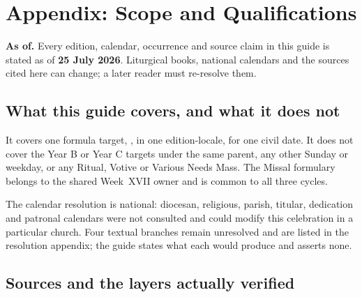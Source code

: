 \section*{Appendix: Scope and Qualifications}

\textbf{As of.} Every edition, calendar, occurrence and source claim in this guide is stated as of \textbf{25 July 2026}. Liturgical books, national calendars and the sources cited here can change; a later reader must re-resolve them.

\subsection*{What this guide covers, and what it does not}

It covers one formula target, , in one edition-locale, for one civil date. It does not cover the Year B or Year C targets under the same parent, any other Sunday or weekday, or any Ritual, Votive or Various Needs Mass. The Missal formulary belongs to the shared Week~XVII owner and is common to all three cycles.

The calendar resolution is national: diocesan, religious, parish, titular, dedication and patronal calendars were not consulted and could modify this celebration in a particular church. Four textual branches remain unresolved and are listed in the resolution appendix; the guide states what each would produce and asserts none.

\subsection*{Sources and the layers actually verified}

